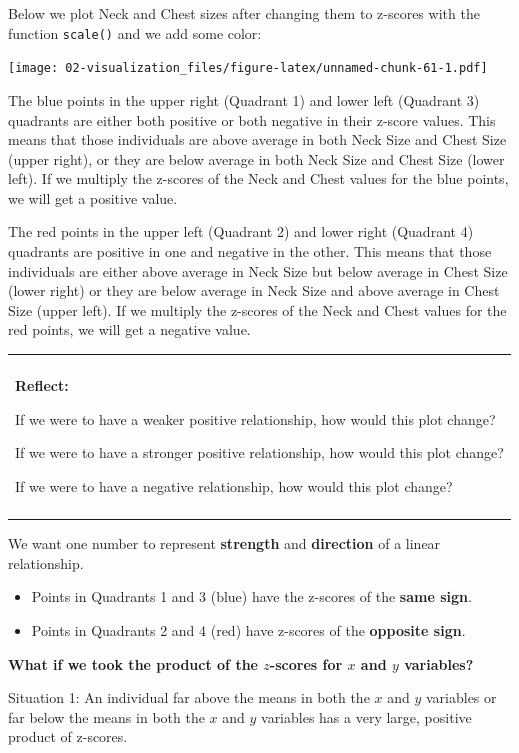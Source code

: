 \documentclass[
]{book}
\providecommand{\tightlist}{%
  \setlength{\itemsep}{0pt}\setlength{\parskip}{0pt}}
\newenvironment{reflect}
{
    \begin{center}
    
    \begin{tabular}{|p{0.8\textwidth}|}
    \rowcolor{LightBlue}
    \hline\\
    \rowcolor{LightBlue}
    \textbf{Reflect:}
}
{
    \\\rowcolor{LightBlue}
    \\\hline
    \end{tabular} 
    \end{center}
}
\begin{document}
Below we plot Neck and Chest sizes after changing them to z-scores with the function \texttt{scale()} and we add some color:

\texttt{[image: 02-visualization\_files/figure-latex/unnamed-chunk-61-1.pdf]}

The blue points in the upper right (Quadrant 1) and lower left (Quadrant 3) quadrants are either both positive or both negative in their z-score values. This means that those individuals are above average in both Neck Size and Chest Size (upper right), or they are below average in both Neck Size and Chest Size (lower left). If we multiply the z-scores of the Neck and Chest values for the blue points, we will get a positive value.

The red points in the upper left (Quadrant 2) and lower right (Quadrant 4) quadrants are positive in one and negative in the other. This means that those individuals are either above average in Neck Size but below average in Chest Size (lower right) or they are below average in Neck Size and above average in Chest Size (upper left). If we multiply the z-scores of the Neck and Chest values for the red points, we will get a negative value.

\begin{reflect}
If we were to have a weaker positive relationship, how would this plot
change?

If we were to have a stronger positive relationship, how would this plot
change?

If we were to have a negative relationship, how would this plot change?
\end{reflect}

We want one number to represent \textbf{strength} and \textbf{direction} of a linear relationship.

\begin{itemize}
\tightlist
\item
  Points in Quadrants 1 and 3 (blue) have the z-scores of the \textbf{same sign}.
\item
  Points in Quadrants 2 and 4 (red) have z-scores of the \textbf{opposite sign}.
\end{itemize}

\textbf{What if we took the product of the \(z\)-scores for \(x\) and \(y\) variables?}

Situation 1: An individual far above the means in both the \(x\) and \(y\) variables or far below the means in both the \(x\) and \(y\) variables has a very large, positive product of z-scores.
\end{document}
